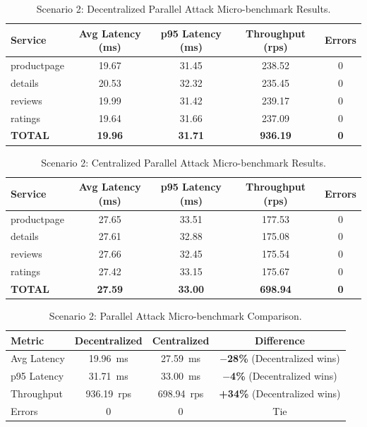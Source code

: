 \begin{table}[htbp]
\renewcommand{\arraystretch}{1.2}
\caption{Scenario 2: Decentralized Parallel Attack Micro-benchmark Results.}
\label{tab:scenario2_dec}
\centering
\footnotesize
\setlength{\tabcolsep}{4pt}
\begin{tabular}{lcccc}
\hline
\textbf{Service} & \textbf{Avg Latency (ms)} & \textbf{p95 Latency (ms)} & \textbf{Throughput (rps)} & \textbf{Errors} \\
\hline
productpage & 19.67 & 31.45 & 238.52 & 0 \\
details     & 20.53 & 32.32 & 235.45 & 0 \\
reviews     & 19.99 & 31.42 & 239.17 & 0 \\
ratings     & 19.64 & 31.66 & 237.09 & 0 \\
\hline
\textbf{TOTAL} & \textbf{19.96} & \textbf{31.71} & \textbf{936.19} & \textbf{0} \\
\hline
\end{tabular}
\end{table}

\begin{table}[htbp]
\renewcommand{\arraystretch}{1.2}
\caption{Scenario 2: Centralized Parallel Attack Micro-benchmark Results.}
\label{tab:scenario2_cen}
\centering
\footnotesize
\setlength{\tabcolsep}{4pt}
\begin{tabular}{lcccc}
\hline
\textbf{Service} & \textbf{Avg Latency (ms)} & \textbf{p95 Latency (ms)} & \textbf{Throughput (rps)} & \textbf{Errors} \\
\hline
productpage & 27.65 & 33.51 & 177.53 & 0 \\
details     & 27.61 & 32.88 & 175.08 & 0 \\
reviews     & 27.66 & 32.45 & 175.54 & 0 \\
ratings     & 27.42 & 33.15 & 175.67 & 0 \\
\hline
\textbf{TOTAL} & \textbf{27.59} & \textbf{33.00} & \textbf{698.94} & \textbf{0} \\
\hline
\end{tabular}
\end{table}

\begin{table}[htbp]
\renewcommand{\arraystretch}{1.2}
\caption{Scenario 2: Parallel Attack Micro-benchmark Comparison.}
\label{tab:scenario2_comp}
\centering
\footnotesize
\setlength{\tabcolsep}{4pt}
\begin{tabular}{lccc}
\hline
\textbf{Metric} & \textbf{Decentralized} & \textbf{Centralized} & \textbf{Difference} \\
\hline
Avg Latency & 19.96~ms   & 27.59~ms   & \textbf{$-$28\%} (Decentralized wins) \\
p95 Latency & 31.71~ms   & 33.00~ms   & \textbf{$-$4\%} (Decentralized wins) \\
Throughput  & 936.19~rps & 698.94~rps & \textbf{+34\%} (Decentralized wins) \\
Errors      & 0          & 0          & Tie \\
\hline
\end{tabular}
\end{table}

